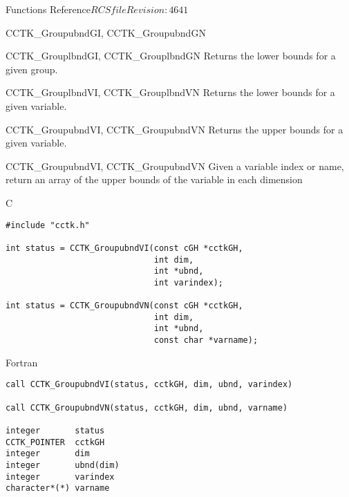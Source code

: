 \begin{cactuspart}{ Functions Reference}{$RCSfile$}{$Revision: 4641 $}
\begin{FunctionDescription}{CCTK\_GroupubndGI, CCTK\_GroupubndGN}
\begin{SeeAlsoSection}
\begin{SeeAlso}{CCTK\_GrouplbndGI, CCTK\_GrouplbndGN}
Returns the lower bounds for a given group.
\end{SeeAlso}
\begin{SeeAlso}{CCTK\_GrouplbndVI, CCTK\_GrouplbndVN}
Returns the lower bounds for a given variable.
\end{SeeAlso}
\begin{SeeAlso}{CCTK\_GroupubndVI, CCTK\_GroupubndVN}
Returns the upper bounds for a given variable.
\end{SeeAlso}
\end{SeeAlsoSection}
\end{FunctionDescription}


\begin{FunctionDescription}{CCTK\_GroupubndVI, CCTK\_GroupubndVN}
\label{CCTK-GroupubndVI}
\label{CCTK-GroupubndVN}
Given a variable index or name, return an array of the upper bounds of the variable in each dimension

\begin{SynopsisSection}
\begin{Synopsis}{C}
\begin{verbatim}
#include "cctk.h"

int status = CCTK_GroupubndVI(const cGH *cctkGH,
                              int dim,
                              int *ubnd,
                              int varindex);

int status = CCTK_GroupubndVN(const cGH *cctkGH,
                              int dim,
                              int *ubnd,
                              const char *varname);
\end{verbatim}
\end{Synopsis}
\begin{Synopsis}{Fortran}
\begin{verbatim}
call CCTK_GroupubndVI(status, cctkGH, dim, ubnd, varindex)

call CCTK_GroupubndVN(status, cctkGH, dim, ubnd, varname)

integer       status
CCTK_POINTER  cctkGH
integer       dim
integer       ubnd(dim)
integer       varindex
character*(*) varname
\end{verbatim}
\end{Synopsis}
\end{SynopsisSection}


\end{FunctionDescription}
\end{cactuspart}
